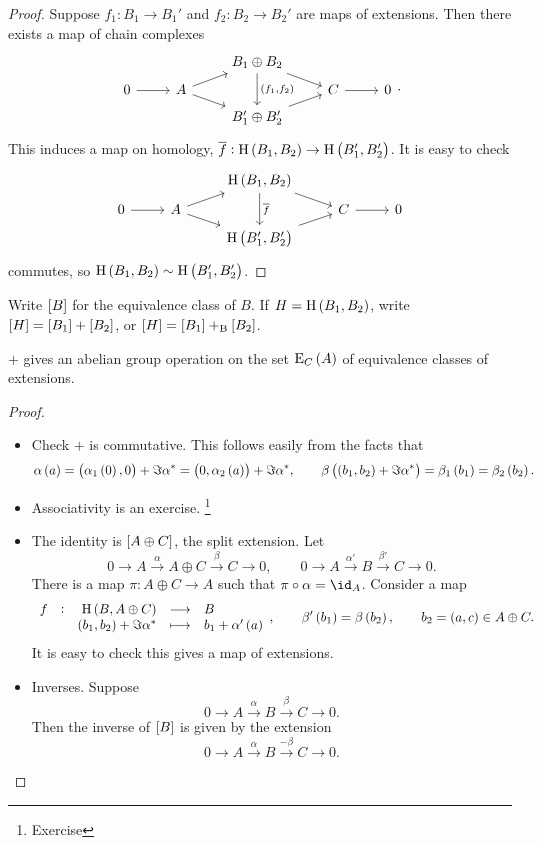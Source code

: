 \begin{proof}
Suppose $ f_1 : B_1 \to B_1' $ and $ f_2 : B_2 \to B_2' $ are maps of extensions. Then there exists a map of chain complexes
$$
\begin{tikzcd}[row sep=tiny]
& & B_1 \oplus B_2 \arrow{dr} \arrow{dd}{\br{f_1, f_2}} & & \\
0 \arrow{r} & A \arrow{ur} \arrow[swap]{dr} & & C \arrow{r} & 0 \\
& & B_1' \oplus B_2' \arrow[swap]{ur} & &
\end{tikzcd}.
$$
This induces a map on homology, $ \overline{f} : \H\br{B_1, B_2} \to \H\br{B_1', B_2'} $. It is easy to check
$$
\begin{tikzcd}[row sep=tiny]
& & \H\br{B_1, B_2} \arrow{dr} \arrow{dd}{\overline{f}} & & \\
0 \arrow{r} & A \arrow{ur} \arrow[swap]{dr} & & C \arrow{r} & 0 \\
& & \H\br{B_1', B_2'} \arrow[swap]{ur} & &
\end{tikzcd}
$$
commutes, so $ \H\br{B_1, B_2} \sim \H\br{B_1', B_2'} $.
\end{proof}

Write $ \sbr{B} $ for the equivalence class of $ B $. If $ H = \H\br{B_1, B_2} $, write $ \sbr{H} = \sbr{B_1} + \sbr{B_2} $, or $ \sbr{H} = \sbr{B_1} +_\B \sbr{B_2} $.

\begin{proposition}
$ + $ gives an abelian group operation on the set $ \E_C\br{A} $ of equivalence classes of extensions.
\end{proposition}

\begin{proof}
\hfill
\begin{itemize}
\item Check $ + $ is commutative. This follows easily from the facts that
$$ \alpha\br{a} = \br{\alpha_1\br{0}, 0} + \Im \alpha^* = \br{0, \alpha_2\br{a}} + \Im \alpha^*, \qquad \beta\br{\br{b_1, b_2} + \Im \alpha^*} = \beta_1\br{b_1} = \beta_2\br{b_2}. $$
\item Associativity is an exercise. \footnote{Exercise}
\item The identity is $ \sbr{A \oplus C} $, the split extension. Let
$$ 0 \to A \xrightarrow{\alpha} A \oplus C \xrightarrow{\beta} C \to 0, \qquad 0 \to A \xrightarrow{\alpha'} B \xrightarrow{\beta'} C \to 0. $$
There is a map $ \pi : A \oplus C \to A $ such that $ \pi \circ \alpha = \id_A $. Consider a map
$$ \function[f]{\H\br{B, A \oplus C}}{B}{\br{b_1, b_2} + \Im \alpha^*}{b_1 + \alpha'\br{a}}, \qquad \beta'\br{b_1} = \beta\br{b_2}, \qquad b_2 = \br{a, c} \in A \oplus C. $$
It is easy to check this gives a map of extensions.
\item Inverses. Suppose
$$ 0 \to A \xrightarrow{\alpha} B \xrightarrow{\beta} C \to 0. $$
Then the inverse of $ \sbr{B} $ is given by the extension
$$ 0 \to A \xrightarrow{\alpha} B \xrightarrow{-\beta} C \to 0. $$
\end{itemize}
\end{proof}

